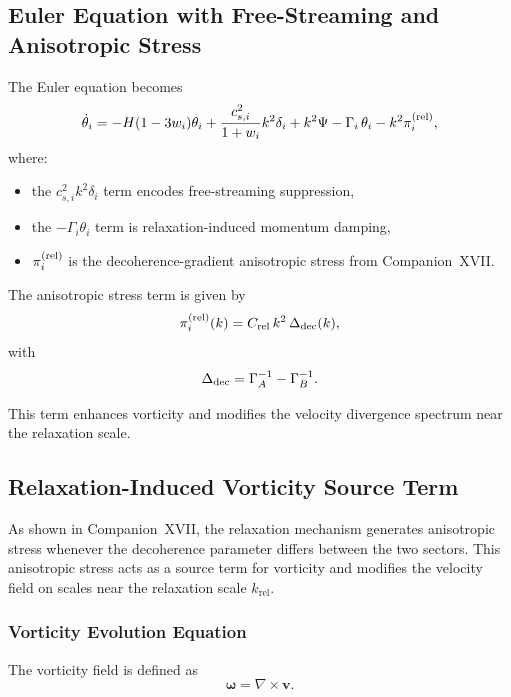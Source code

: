 \documentclass[11pt,a4paper]{article}
\begin{document}
\subsection{Euler Equation with Free-Streaming and Anisotropic Stress}

The Euler equation becomes
\begin{equation}
\dot{\theta}_i
= -H(1 - 3w_i)\theta_i
+ \frac{c_{s,i}^2}{1+w_i}k^2\delta_i
+ k^2\Psi
- \Gamma_i\,\theta_i
- k^2\pi_i^{\rm (rel)},
\end{equation}
where:
\begin{itemize}
\item the $c_{s,i}^2 k^2 \delta_i$ term encodes free-streaming suppression,
\item the $-\Gamma_i\theta_i$ term is relaxation-induced momentum damping,
\item $\pi_i^{\rm (rel)}$ is the decoherence-gradient anisotropic stress from Companion~XVII.
\end{itemize}

The anisotropic stress term is given by
\begin{equation}
\pi_i^{\rm (rel)}(k)
= C_{\rm rel}\,k^2\,\Delta_{\rm dec}(k),
\end{equation}
with
\begin{equation}
\Delta_{\rm dec}
= \Gamma_A^{-1} - \Gamma_B^{-1}.
\end{equation}

This term enhances vorticity and modifies the velocity divergence spectrum near the
relaxation scale.

\subsection{Relaxation-Induced Vorticity Source Term}
\label{sec:vorticity-source}

As shown in Companion~XVII, the relaxation mechanism generates anisotropic stress
whenever the decoherence parameter differs between the two sectors. This anisotropic
stress acts as a source term for vorticity and modifies the velocity field on scales near the
relaxation scale $k_{\mathrm{rel}}$.

\subsubsection{Vorticity Evolution Equation}

The vorticity field is defined as
\begin{equation}
\boldsymbol{\omega}
=
\nabla \times \mathbf{v}.
\end{equation}
\end{document}
